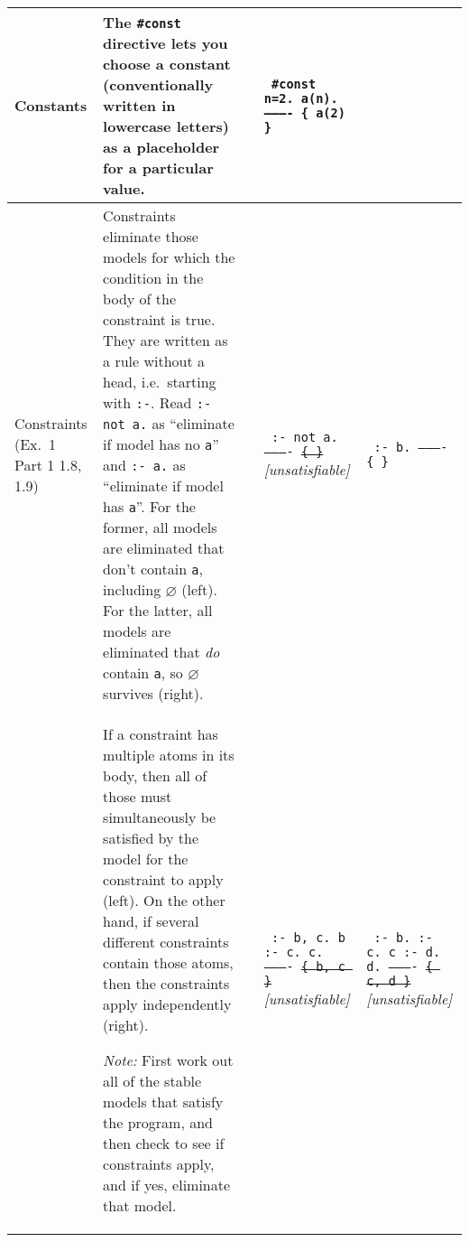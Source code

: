 \documentclass[9pt,a4paper,landscape]{article}
\begin{document}
{\begin{longtable}{Lp{14.5cm}lXX}
\\ \midrule

Constants
& The \texttt{\#const} directive lets you choose a constant (conventionally written in lowercase letters) as a placeholder for a particular value.
&& \texttt{%
	\#const n=2. \newline
	a(n). \newline
	---------- \newline
	\{ a(2) \}} & \\ \midrule


Constraints \newline (Ex.\ 1 Part 1  1.8, 1.9)
& Constraints eliminate those models for which the condition in the body of the constraint is true.
They are written as a rule without a head, i.e.\ starting with \texttt{:-}.
Read \texttt{:- not a.} as ``eliminate if model has no \texttt{a}'' and \texttt{:- a.} as ``eliminate if model has \texttt{a}''.
For the former, all models are eliminated that don't contain \texttt{a}, including $\varnothing$ (left).
For the latter, all models are eliminated that \textit{do} contain \texttt{a}, so $\varnothing$ survives (right).

&& \texttt{%
	:- not a. \newline
	---------- \newline
	\sout{\{ \}}} \newline		
\textit{[unsatisfiable]}
& \texttt{%
	:- b. \newline
	---------- \newline
	\{ \} } \\

& If a constraint has multiple atoms in its body, then all of those must simultaneously be satisfied by the model for the constraint to apply (left).
On the other hand, if several different constraints contain those atoms, then the constraints apply independently (right). \newline

\textit{Note:} First work out all of the stable models that satisfy the program, and then check to see if constraints apply, and if yes, eliminate that model.
&& \texttt{%
	:- b, c. \newline
	b :- c. \newline
	c. \newline
	---------- \newline
	\sout{\{ b, c \}} } \newline
\textit{[unsatisfiable]}
& \texttt{%
	:- b. \newline
	:- c. \newline
	c :- d. \newline
	d. \newline
	---------- \newline
	\sout{\{ c, d \}} } \newline
\textit{[unsatisfiable]} \\ \midrule


\end{longtable}}
\end{document}
